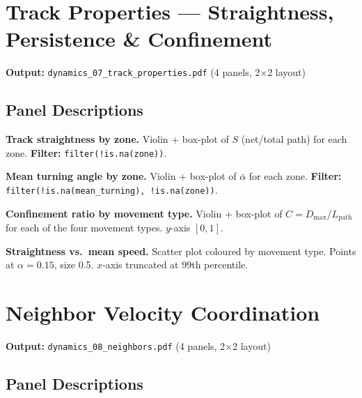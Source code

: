 \documentclass[11pt,a4paper]{article}
\begin{document}
\section{Track Properties --- Straightness, Persistence \& Confinement}
\label{fig:track_props}

\noindent\textbf{Output:} \texttt{dynamics\_07\_track\_properties.pdf}
(4 panels, 2$\times$2 layout)

\subsection*{Panel Descriptions}

\begin{description}[style=nextline,leftmargin=1.5cm]
  \item[07a] \textbf{Track straightness by zone.}
    Violin + box-plot of $S$ (net/total path) for each zone.
    \textbf{Filter:} \texttt{filter(!is.na(zone))}.

  \item[07b] \textbf{Mean turning angle by zone.}
    Violin + box-plot of $\bar\alpha$ for each zone.
    \textbf{Filter:} \texttt{filter(!is.na(mean\_turning), !is.na(zone))}.

  \item[07c] \textbf{Confinement ratio by movement type.}
    Violin + box-plot of $C = D_\mathrm{max}/L_\mathrm{path}$ for each
    of the four movement types.  $y$-axis $[0,1]$.

  \item[07d] \textbf{Straightness vs.\ mean speed.}
    Scatter plot coloured by movement type.  Points at $\alpha=0.15$,
    size 0.5.  $x$-axis truncated at 99th percentile.
\end{description}


\section{Neighbor Velocity Coordination}
\label{fig:neighbors}

\noindent\textbf{Output:} \texttt{dynamics\_08\_neighbors.pdf}
(4 panels, 2$\times$2 layout)

\subsection*{Panel Descriptions}
\end{document}
